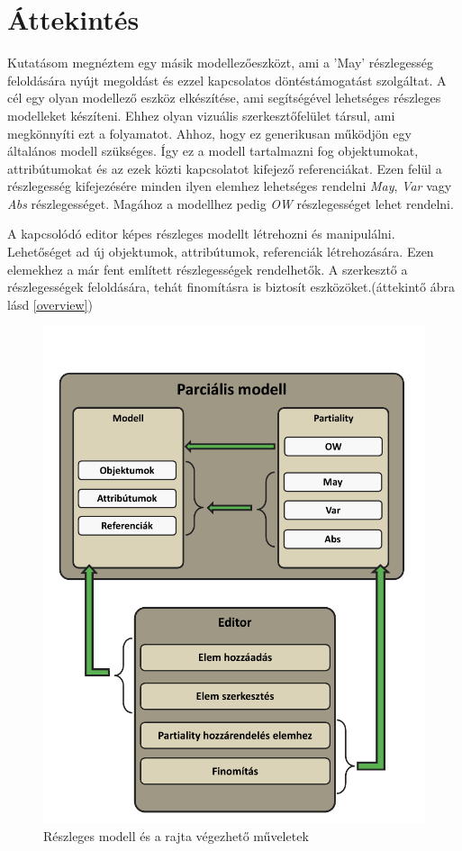 \chapter{Áttekintés}


Kutatásom megnéztem egy másik modellezőeszközt, ami a 'May' részlegesség feloldására nyújt megoldást és ezzel kapcsolatos döntéstámogatást szolgáltat\cite{Michalis}. A cél egy olyan modellező eszköz elkészítése, ami segítségével lehetséges részleges modelleket készíteni. Ehhez olyan vizuális szerkesztőfelület társul, ami megkönnyíti ezt a folyamatot. Ahhoz, hogy ez generikusan működjön egy általános modell szükséges. Így ez a modell tartalmazni fog objektumokat, attribútumokat és az ezek közti kapcsolatot kifejező referenciákat. Ezen felül a részlegesség kifejezésére minden ilyen elemhez lehetséges rendelni \textit{May}, \textit{Var} vagy \textit{Abs} részlegességet. Magához a modellhez pedig \textit{OW} részlegességet lehet rendelni.
\par
A kapcsolódó editor képes részleges modellt létrehozni és manipulálni. Lehetőséget ad új objektumok, attribútumok, referenciák létrehozására. Ezen elemekhez a már fent említett részlegességek rendelhetők. A szerkesztő a részlegességek feloldására, tehát finomításra is biztosít eszközöket.(áttekintő ábra lásd \autoref{overview})



\begin{figure}[!ht]
	\includegraphics[width=150mm]{figures/overview.pdf}
	\caption{Részleges modell és a rajta végezhető műveletek} 
	\label{overview}
\end{figure}


